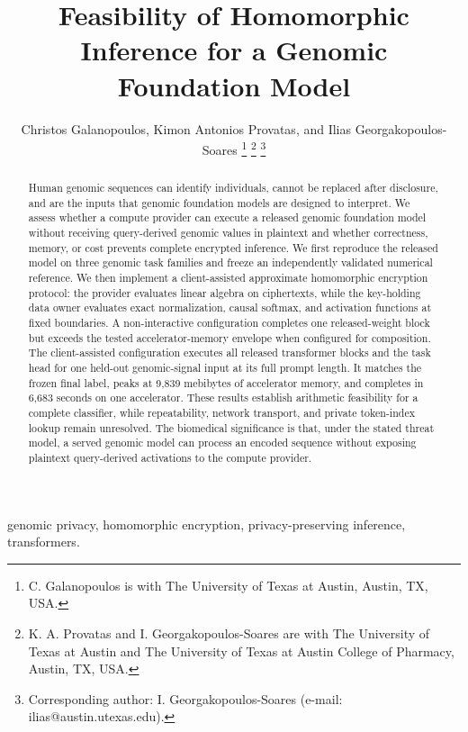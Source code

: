%

\title{Feasibility of Homomorphic Inference for a Genomic Foundation Model}

\author{Christos Galanopoulos, Kimon Antonios Provatas, and Ilias Georgakopoulos-Soares%
\thanks{C. Galanopoulos is with The University of Texas at Austin, Austin, TX, USA.}%
\thanks{K. A. Provatas and I. Georgakopoulos-Soares are with The University of Texas at Austin
and The University of Texas at Austin College of Pharmacy, Austin, TX, USA.}%
\thanks{Corresponding author: I. Georgakopoulos-Soares (e-mail: ilias@austin.utexas.edu).}%
}

\maketitle

\begin{abstract}
Human genomic sequences can identify individuals, cannot be replaced after disclosure, and are the
inputs that genomic foundation models are designed to interpret. We assess whether a compute
provider can execute a released genomic foundation model without receiving query-derived genomic
values in plaintext and whether
correctness, memory, or cost prevents complete encrypted inference. We first reproduce the released
model on three genomic task families and freeze an independently validated numerical reference. We
then implement a client-assisted approximate homomorphic encryption protocol: the provider evaluates
linear algebra on ciphertexts, while the key-holding data owner evaluates exact normalization,
causal softmax, and activation functions at fixed boundaries. A non-interactive configuration
completes one released-weight block but exceeds the tested accelerator-memory envelope when
configured for composition. The client-assisted configuration executes all released transformer
blocks and the task head for one held-out genomic-signal input at its full prompt length. It matches
the frozen final label, peaks at 9{,}839 mebibytes of accelerator memory, and completes in 6{,}683
seconds on one accelerator. These results establish arithmetic feasibility for a complete
classifier, while repeatability, network transport, and private token-index lookup remain
unresolved. The biomedical significance is that, under the stated threat model, a served genomic
model can process an encoded sequence without exposing plaintext query-derived activations to the
compute provider.
\end{abstract}

\begin{IEEEkeywords}
genomic privacy, homomorphic encryption, privacy-preserving inference, transformers.
\end{IEEEkeywords}
